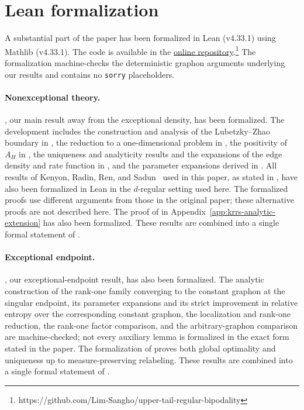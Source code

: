 \section{Lean formalization}\label{sec:lean-formalization}

A substantial part of the paper has been formalized in Lean (v4.33.1) using
Mathlib (v4.33.1).  The code is available in the
\href{https://github.com/Lim-Sangho/upper-tail-regular-bipodality}{online
repository}.\footnote{https://github.com/Lim-Sangho/upper-tail-regular-bipodality}
The formalization machine-checks the deterministic graphon arguments
underlying our results and contains no \texttt{sorry} placeholders.

\paragraph{Nonexceptional theory.}
, our main result away from the
exceptional density, has been formalized.
The development includes the construction and analysis of the
Lubetzky--Zhao boundary in
, the reduction to a one-dimensional problem in
, the positivity of $A_H$ in
, the uniqueness and analyticity results and the
expansions of the edge density and rate function in
, and the parameter expansions derived in
.
All results of Kenyon, Radin, Ren, and Sadun~\cite{kenyon2014entropy}
used in this paper, as stated in ,
have also been formalized in Lean in the $d$-regular setting used here.
The formalized proofs use different
arguments from those in the original paper; these alternative proofs are
not described here.  The proof of  in
Appendix~\ref{app:krrs-analytic-extension} has also been formalized.
These results are combined into a single formal statement of
.

\paragraph{Exceptional endpoint.}
, our exceptional-endpoint result, has also
been formalized.
The analytic construction of the rank-one family converging to the
constant graphon at the singular endpoint, its parameter expansions and its strict
improvement in relative entropy over the corresponding constant graphon,
the localization and rank-one reduction, the rank-one
factor comparison, and the arbitrary-graphon comparison are
machine-checked; not every auxiliary lemma is formalized in the exact
form stated in the paper.  The formalization of 
proves both global optimality and uniqueness up to measure-preserving relabeling.
These results are combined into a single formal statement of
.

